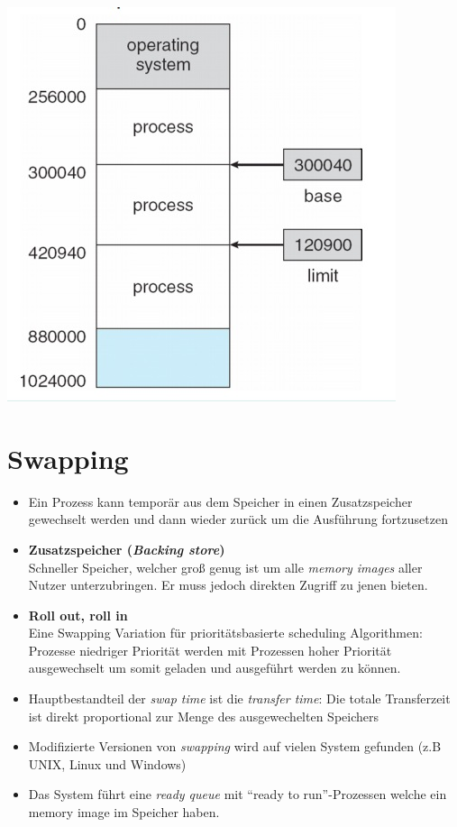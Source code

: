 \documentclass[a4paper]{scrreprt}
\begin{document}
\begin{center}
\includegraphics[scale=0.5]{graphics/baseandlimitprotection.png}
\end{center}


\section{Swapping}
\begin{itemize}
\item Ein Prozess kann temporär aus dem Speicher in einen Zusatzspeicher gewechselt werden und dann wieder zurück um die Ausführung fortzusetzen
\item \textbf{Zusatzspeicher (\textit{Backing store})} \ \\ Schneller Speicher, welcher groß genug ist um alle \textit{memory images} aller Nutzer unterzubringen. Er muss jedoch direkten Zugriff zu jenen bieten.
\item \textbf{Roll out, roll in} \ \\ Eine Swapping Variation für prioritätsbasierte scheduling Algorithmen: Prozesse niedriger Priorität werden mit Prozessen hoher Priorität ausgewechselt um somit geladen und ausgeführt werden zu können.

\item Hauptbestandteil der \textit{swap time} ist die \textit{transfer time}: Die totale Transferzeit ist direkt proportional zur Menge des ausgewechelten Speichers
\item Modifizierte Versionen von \textit{swapping} wird auf vielen System gefunden (z.B UNIX, Linux und Windows)
\item Das System führt eine \textit{ready queue} mit "`ready to run"'-Prozessen welche ein memory image im Speicher haben.

\end{itemize}
\end{document}
